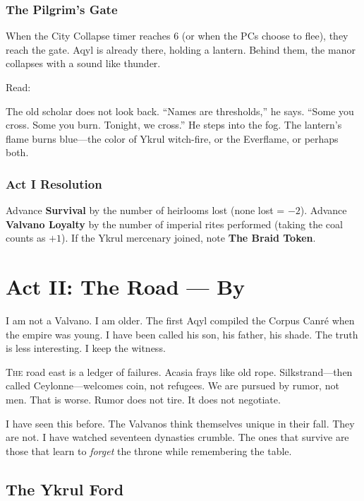 \documentclass[11pt,a5paper]{book}
\begin{document}
\subsection*{The Pilgrim's Gate}

When the City Collapse timer reaches 6 (or when the PCs choose to flee), they reach the gate. Aqyl is already there, holding a lantern. Behind them, the manor collapses with a sound like thunder.

Read:
\begin{quoting}
The old scholar does not look back. ``Names are thresholds,'' he says. ``Some you cross. Some you burn. Tonight, we cross.'' He steps into the fog. The lantern's flame burns blue---the color of Ykrul witch-fire, or the Everflame, or perhaps both.
\end{quoting}

\subsection*{Act I Resolution}

Advance \textbf{Survival} by the number of heirlooms lost (none lost = $-2$). Advance \textbf{Valvano Loyalty} by the number of imperial rites performed (taking the coal counts as $+1$). If the Ykrul mercenary joined, note \textbf{The Braid Token}.

\clearpage

\chapter{Act II: The Road --- By \aqyl}

\epigraph{I am not a Valvano. I am older. The first Aqyl compiled the Corpus Canr\'e when the empire was young. I have been called his son, his father, his shade. The truth is less interesting. I keep the witness.}{\aqyl}

\lettrine{T}{he} road east is a ledger of failures. Acasia frays like old rope. Silkstrand---then called Ceylonne---welcomes coin, not refugees. We are pursued by rumor, not men. That is worse. Rumor does not tire. It does not negotiate.

I have seen this before. The Valvanos think themselves unique in their fall. They are not. I have watched seventeen dynasties crumble. The ones that survive are those that learn to \textit{forget} the throne while remembering the table.

\section*{The Ykrul Ford}
\end{document}
